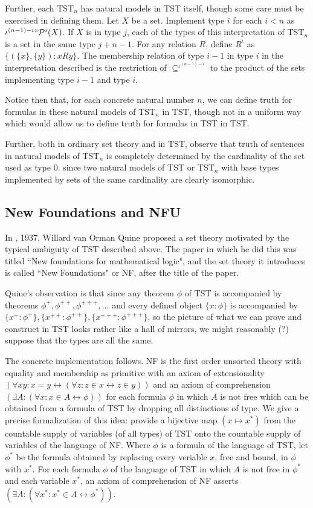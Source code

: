 \documentclass[112pt]{article}
\begin{document}
Further, each TST$_n$ has natural models in TST itself, though some care must be exercised in defining them.  Let $X$ be a set.  Implement type $i$ for each $i<n$ as
$\iota^{(n-1)-i}``{\cal P}^i(X)$.  If $X$ is in type $j$, each of the types of this interpretation of TST$_n$ is a set in the same type $j+n-1$.  For any relation $R$, define
$R^{\iota}$ as $\{(\{x\},\{y\}):x R y\}$.  The membership relation of type $i-1$ in type $i$ in the interpretation described is the restriction of $\subseteq^{\iota^{(n-1)-i}}$ to
the product of the sets implementing type $i-1$ and type $i$.

Notice then that, for each concrete natural number $n$, we can define truth for formulas in these natural models of TST$_n$  in TST, though not in a uniform way which would allow us to define truth for formulas
in TST in TST.

Further, both in ordinary set theory and in TST, observe that truth of sentences in natural models of TST$_n$ is completely determined by the cardinality of the set used as type 0.
since two natural models of TST or TST$_n$ with base types implemented by sets of the same cardinality are clearly isomorphic. 

\newpage

\subsection{New Foundations and NFU}

In \cite{nf}, 1937, Willard van Orman Quine proposed a set theory motivated by the typical ambiguity of TST described above.  The paper in which he did this was titled ``New foundations for mathematical logic", and the set theory it introduces is called ``New Foundations" or NF, after the title of the paper.

Quine's observation is that since any theorem $\phi$ of TST is accompanied by theorems $\phi^+, \phi^{++}, \phi^{+++}, \ldots$ and every defined object $\{x:\phi\}$ is accompanied by
$\{x^+:\phi^+\},\{x^{++}:\phi^{++}\},\{x^{+++}:\phi^{+++}\}$, so the picture of what we can prove and construct in TST looks rather like a hall of mirrors, we might reasonably (?) suppose that the types are all the same.

The concrete implementation follows.  NF is the first order unsorted theory with equality and membership as primitive with an axiom of extensionality $(\forall xy:x=y \leftrightarrow (\forall z:z \in x \leftrightarrow z\in y))$ and an axiom of comprehension $(\exists A:(\forall x:x \in A \leftrightarrow \phi))$ for each formula $\phi$ in which $A$ is not free which can be obtained from a formula of TST by dropping all distinctions of type.  We give a precise formalization of this idea:  provide a bijective map $(x \mapsto x^*)$ from the countable supply of variables (of all types) of TST onto the countable supply of variables of the language of NF.  Where $\phi$ is a formula of the language of TST, let $\phi^*$ be the formula obtained by replacing every veriable $x$, free and bound,
in $\phi$ with $x^*$. For each formula $\phi$ of the language of TST in which $A$ is not free in $\phi^*$ and each variable $x^*$, an axiom of comprehension of NF asserts $(\exists A:(\forall x^*:x^* \in A \leftrightarrow \phi^*))$.
\end{document}
